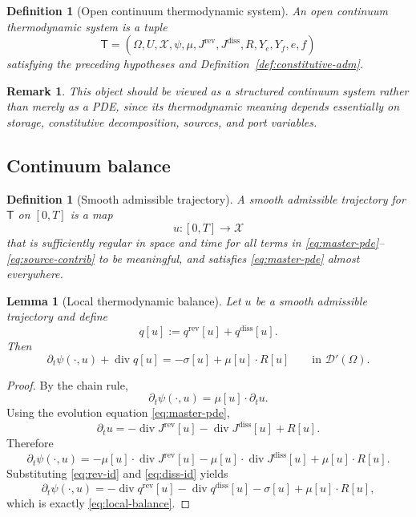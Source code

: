 \documentclass[11pt]{article}
\newtheorem{definition}[theorem]{Definition}
\newtheorem{lemma}[theorem]{Lemma}
\newtheorem{remark}[theorem]{Remark}
\newcommand{\Om}{\Omega}
\newcommand{\diver}{\operatorname{div}}
\newcommand{\X}{\mathcal{X}}
\begin{document}
\begin{definition}[Open continuum thermodynamic system]
An \emph{open continuum thermodynamic system} is a tuple
\[
\mathsf{T}
=
(\Om,U,\X,\psi,\mu,J^{\mathrm{rev}},J^{\mathrm{diss}},R,Y_e,Y_f,e,f)
\]
satisfying the preceding hypotheses and Definition~\ref{def:constitutive-adm}.
\end{definition}

\begin{remark}
This object should be viewed as a structured continuum system rather than merely as a
PDE, since its thermodynamic meaning depends essentially on storage, constitutive
decomposition, sources, and port variables.
\end{remark}

\subsection{Continuum balance}

\begin{definition}[Smooth admissible trajectory]
A \emph{smooth admissible trajectory} for \(\mathsf{T}\) on \([0,T]\) is a map
\[
u:[0,T]\to \X
\]
that is sufficiently regular in space and time for all terms in
\eqref{eq:master-pde}--\eqref{eq:source-contrib} to be meaningful, and satisfies
\eqref{eq:master-pde} almost everywhere.
\end{definition}

\begin{lemma}[Local thermodynamic balance]\label{lem:local-balance}
Let \(u\) be a smooth admissible trajectory and define
\[
q[u]:=q^{\mathrm{rev}}[u]+q^{\mathrm{diss}}[u].
\]
Then
\begin{equation}\label{eq:local-balance}
\partial_t \psi(\cdot,u) + \diver q[u]
=
-\sigma[u] + \mu[u]\cdot R[u]
\qquad \text{in }\mathscr{D}'(\Om).
\end{equation}
\end{lemma}

\begin{proof}
By the chain rule,
\[
\partial_t \psi(\cdot,u)=\mu[u]\cdot \partial_t u.
\]
Using the evolution equation \eqref{eq:master-pde},
\[
\partial_t u=-\diver J^{\mathrm{rev}}[u]-\diver J^{\mathrm{diss}}[u]+R[u].
\]
Therefore
\[
\partial_t \psi(\cdot,u)
=
-\mu[u]\cdot \diver J^{\mathrm{rev}}[u]
-\mu[u]\cdot \diver J^{\mathrm{diss}}[u]
+\mu[u]\cdot R[u].
\]
Substituting \eqref{eq:rev-id} and \eqref{eq:diss-id} yields
\[
\partial_t \psi(\cdot,u)
=
-\diver q^{\mathrm{rev}}[u]
-\diver q^{\mathrm{diss}}[u]
-\sigma[u]
+\mu[u]\cdot R[u],
\]
which is exactly \eqref{eq:local-balance}.
\end{proof}
\end{document}
